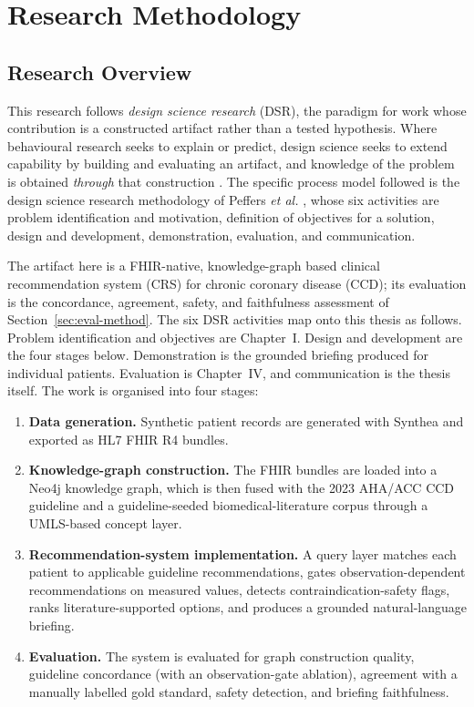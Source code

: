 \chapter{Research Methodology}


\section{Research Overview}

This research follows \emph{design science research} (DSR), the paradigm for work whose
contribution is a constructed artifact rather than a tested hypothesis. Where behavioural
research seeks to explain or predict, design science seeks to extend capability by building
and evaluating an artifact, and knowledge of the problem is obtained \emph{through} that
construction \cite{hevner2004}. The specific process model followed is the design science
research methodology of Peffers \textit{et al.} \cite{peffers2007}, whose six activities are
problem identification and motivation, definition of objectives for a solution, design and
development, demonstration, evaluation, and communication.

The artifact here is a FHIR-native, knowledge-graph based clinical recommendation system
(CRS) for chronic coronary disease (CCD); its evaluation is the concordance, agreement,
safety, and faithfulness assessment of Section~\ref{sec:eval-method}. The six DSR activities map onto this thesis as follows. Problem identification and
objectives are Chapter~I. Design and development are the four stages below. Demonstration is
the grounded briefing produced for individual patients. Evaluation is Chapter~IV, and
communication is the thesis itself. The
work is organised into four stages:

\begin{enumerate}
    \item \textbf{Data generation.} Synthetic patient records are generated with Synthea
    and exported as HL7 FHIR R4 bundles.
    \item \textbf{Knowledge-graph construction.} The FHIR bundles are loaded into a Neo4j
    knowledge graph, which is then fused with the 2023 AHA/ACC CCD guideline and a
    guideline-seeded biomedical-literature corpus through a UMLS-based concept layer.
    \item \textbf{Recommendation-system implementation.} A query layer matches each patient to
    applicable guideline recommendations, gates observation-dependent recommendations on
    measured values, detects contraindication-safety flags, ranks literature-supported
    options, and produces a grounded natural-language briefing.
    \item \textbf{Evaluation.} The system is evaluated for graph construction quality,
    guideline concordance (with an observation-gate ablation), agreement with a manually
    labelled gold standard, safety detection, and briefing faithfulness.
\end{enumerate}

